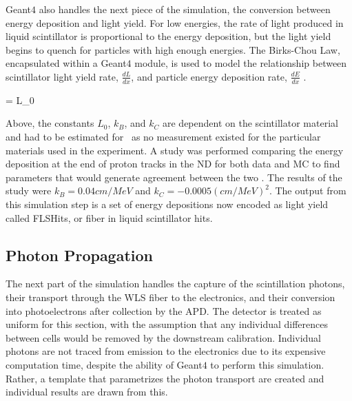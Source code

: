 Geant$4$ also handles the next piece of the simulation, the conversion between energy deposition and light yield. For low energies, the rate of light produced in liquid scintillator is proportional to the energy deposition, but the light yield begins to quench for particles with high enough energies. The Birks-Chou Law, encapsulated within a Geant$4$ module, is used to model the relationship between scintillator light yield rate, $\frac{dL}{dx}$, and particle energy deposition rate, $\frac{dE}{dx}$ \cite{ref:BirksChou}.

\beq
{} = L_0  
\label{eq:BirksChou}
\eeq

\n Above, the constants $L_0$, $k_B$, and $k_C$ are dependent on the scintillator material and had to be estimated for \nova~as no measurement existed for the particular materials used in the experiment. A study was performed comparing the energy deposition at the end of proton tracks in the ND for both data and MC to find parameters that would generate agreement between the two \cite{ref:DanBirks}. The results of the study were $k_B = 0.04\unit{cm/MeV}$ and $k_C = -0.0005\unit{(cm/MeV)}^2$. The output from this simulation step is a set of energy depositions now encoded as light yield called FLSHits, or fiber in liquid scintillator hits.

\subsection{Photon Propagation}
\label{sec:Photon}

The next part of the simulation handles the capture of the scintillation photons, their transport through the WLS fiber to the electronics, and their conversion into photoelectrons after collection by the APD. The detector is treated as uniform for this section, with the assumption that any individual differences between cells would be removed by the downstream calibration. Individual photons are not traced from emission to the electronics due to its expensive computation time, despite the ability of Geant$4$ to perform this simulation. Rather, a template that parametrizes the photon transport are created and individual results are drawn from this.

